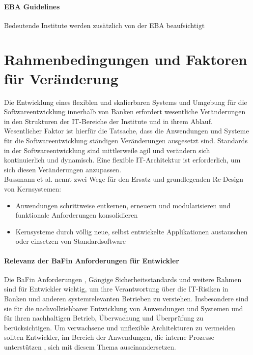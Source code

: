 \paragraph{EBA Guidelines}
Bedeutende Institute werden zusätzlich von der \ac{EBA} beaufsichtigt \cite{recht/Bornemann2018}

\section{Rahmenbedingungen und Faktoren für Veränderung}

Die Entwicklung eines flexiblen und skalierbaren Systems und Umgebung für die Softwareentwicklung innerhalb von Banken erfordert wesentliche Veränderungen in den Strukturen der IT-Bereiche der Institute und in ihrem Ablauf. Wesentlicher Faktor ist hierfür die Tatsache, dass die Anwendungen und Systeme für die Softwareentwicklung ständigen Veränderungen ausgesetzt sind. Standards in der Softwareentwicklung sind mittlerweile agil und verändern sich kontinuierlich und dynamisch. Eine flexible IT-Architektur ist erforderlich, um sich diesen Veränderungen anzupassen.
\medskip
\\
Bussmann et al. nennt zwei Wege für den Ersatz und grundlegenden Re-Design von Kernsystemen: \cite{Bussmann2006}
\begin{itemize}
    \item Anwendungen schrittweise entkernen, erneuern und modularisieren und funktionale Anforderungen konsolidieren
    \item Kernsysteme durch völlig neue, selbst entwickelte Applikationen austauschen oder einsetzen von Standardsoftware
\end{itemize}
%

\paragraph{Relevanz der BaFin Anforderungen für Entwickler}
Die BaFin Anforderungen \cite{MaRisk:2017, BAIT:2018}, Gängige Sicherheitsstandards \cite{IT-Grundschutz:2020, Disterer2013} und weitere Rahmen sind für Entwickler wichtig, um ihre Verantwortung über die IT-Risiken in Banken und anderen systemrelevanten Betrieben zu verstehen. Insbesondere sind sie für die nachvollziehbarer Entwicklung von Anwendungen und Systemen und für ihren nachhaltigen Betrieb, Überwachung und Überprüfung zu berücksichtigen. Um verwachsene und unflexible Architekturen zu vermeiden sollten Entwickler, im Bereich der Anwendungen, die interne Prozesse unterstützen \cite{Bussmann2006}, sich mit diesem Thema auseinandersetzen.

